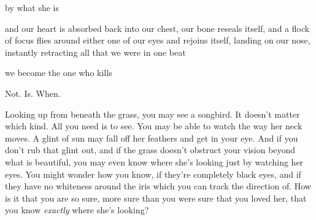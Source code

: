\documentclass[11pt]{article}
\begin{document}
\begingroup
\begin{center}
by what she is
\rightskip\leftskip
\end{center}
\endgroup

\begingroup
\begin{center}
and our heart is absorbed back into our chest, our bone reseals itself, and a flock of focus flies around either one of our eyes and rejoins itself, landing on our nose, instantly retracting all that we were in one beat
\rightskip\leftskip
\end{center}
\endgroup

\begingroup
\begin{center}
we become the one who kills
\rightskip\leftskip
\end{center}
\endgroup

\vspace*{4\baselineskip}

\begingroup
\begin{center}
Not. Is. When.
\rightskip\leftskip
\end{center}
\endgroup

\vspace*{4\baselineskip}

\begingroup
Looking up from beneath the grass, you may see a songbird. It doesn't matter which kind. All you need is to see. You may be able to watch the way her neck moves. A glint of sun may fall off her feathers and get in your eye. And if you don't rub that glint out, and if the grass doesn't obstruct your vision beyond what is beautiful, you may even know where she's looking just by watching her eyes. You might wonder how you know, if they're completely black eyes, and if they have no whiteness around the iris which you can track the direction of. How is it that you are so sure, more sure than you were sure that you loved her, that you know \textit{exactly} where she's looking?
\endgroup
\end{document}
